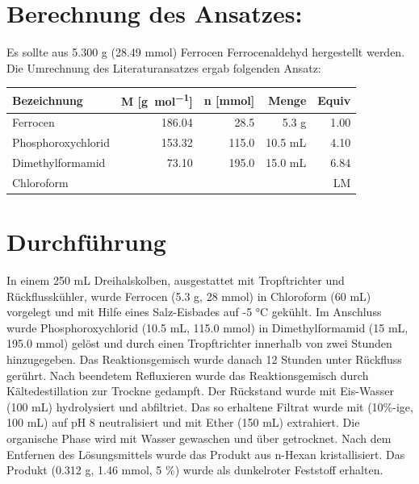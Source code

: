 \documentclass[12pt]{article}
\begin{document}
\begin{onehalfspace}

\section{Berechnung des Ansatzes: }
Es sollte aus 5.300 g (28.49 \si{\milli\mol}) Ferrocen Ferrocenaldehyd hergestellt werden.
Die Umrechnung des Literaturansatzes\cite{bio} ergab folgenden Ansatz:\\[0.5cm]
\begin{tabularx}{\textwidth}{lrrrr}
\toprule
\textbf{Bezeichnung}&\textbf{ M [\si{\gram\per\mol}]} & \textbf{n [\si{\milli\mol}]} & \textbf{Menge} & \textbf{Equiv}\\
\midrule
Ferrocen & 186.04 & 28.5  &  5.3 \si{\gram} &1.00   \\
Phosphoroxychlorid  & 153.32 & 115.0  & 10.5 \si{\milli\liter} & 4.10   \\
Dimethylformamid     & 73.10  & 195.0  & 15.0 \si{\milli\liter} & 6.84   \\
Chloroform     &  &  &  & LM   \\
\bottomrule
\end{tabularx}

\normalsize \section{Durchführung \cite{bio}}
In einem 250 \si{\milli\liter} Dreihalskolben, ausgestattet mit Tropftrichter und Rückflusskühler, wurde Ferrocen (5.3 g, 28 \si{\milli\mol}) in Chloroform (60 \si{\milli\liter}) vorgelegt und mit Hilfe eines Salz-Eisbades auf -5 \si{\celsius} gekühlt. Im Anschluss wurde Phosphoroxychlorid (10.5 \si{\milli\liter}, 115.0 \si{\milli\mol}) in Dimethylformamid (15 \si{\milli\liter}, 195.0 \si{\milli\mol}) gelöst und durch einen Tropftrichter innerhalb von zwei Stunden  hinzugegeben. Das Reaktionsgemisch wurde danach 12 Stunden unter Rückfluss gerührt. Nach beendetem Refluxieren wurde das Reaktionsgemisch durch Kältedestillation zur Trockne gedampft. Der Rückstand wurde mit Eis-Wasser (100 \si{\milli\liter}) hydrolysiert und abfiltriet. Das so erhaltene Filtrat wurde mit  (10\%-ige, 100 \si{\milli\liter}) auf pH 8 neutralisiert und mit Ether (150 \si{\milli\liter}) extrahiert. Die organische Phase wird mit Wasser gewaschen und über  getrocknet. Nach dem Entfernen des Lösungsmittels wurde das Produkt aus n-Hexan kristallisiert. Das Produkt (0.312 \si{\gram}, 1.46 \si{\milli\mol}, 5 \%) wurde als dunkelroter Feststoff erhalten.


\end{onehalfspace}
\end{document}
